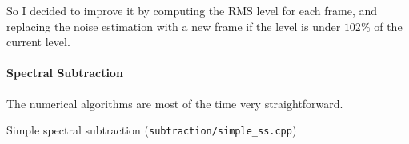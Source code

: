 So I decided to improve it by computing the \ac{RMS} level for each frame, and replacing the noise estimation with a new frame if the level is under $102\%$ of the current level.
\paragraph{Spectral Subtraction}
The numerical algorithms are most of the time very straightforward.

\begin{algorithm}
 \SetAlgoLined

 \caption{Simple spectral subtraction (\texttt{subtraction/simple\_ss.cpp})}
\end{algorithm}


